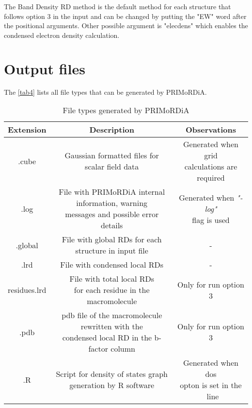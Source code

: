 \documentclass[a4paper,11pt]{refart}
\begin{document}
The Band Density RD method is the default method for each structure that follows option 3 in the input and can be changed by putting the "EW" word after the positional arguments. Other possible argument is "elecdens" which enables the condensed electron density calculation.  

\section{Output files} 

The \autoref{tab4} lists all file types that can be generated by PRIMoRDiA. 

\hspace*{-\leftmarginwidth}
\begin{minipage}{\fullwidth}
	\begin{table}[H]
		\centering	
		\caption{File types generated by PRIMoRDiA}
		\begin{tabular}{c|c|c}
			\toprule
			Extension & Description & Observations \\
			\midrule
		    .cube	& Gaussian formatted files for scalar field data   & \makecell{ Generated when grid \\ calculations are required } \\  \hline	
			.log    & \makecell{File with PRIMoRDiA internal information, warning \\ messages and possible error details}  & \makecell{  Generated when \emph{"-log"}\\ flag is used  }  \\ \hline	
			.global & \makecell{File with global RDs for each  \\ structure in input file } &  - \\ \hline			
			.lrd    & File with condensed local RDs & -  \\ \hline
			residues.lrd& \makecell{File with total local RDs \\ for each residue in the macromolecule} & Only for run option 3 \\ \hline
			.pdb & \makecell{pdb file of the macromolecule rewritten with the \\ condensed local RD in the b-factor column}  & Only for run option 3 \\ \hline
			.R& \makecell{Script for density of states graph\\ generation by R software} & \makecell{Generated when dos \\ opton is set in the \ line} \\ \hline

\end{tabular}
\end{table}
\end{minipage}
\end{document}
